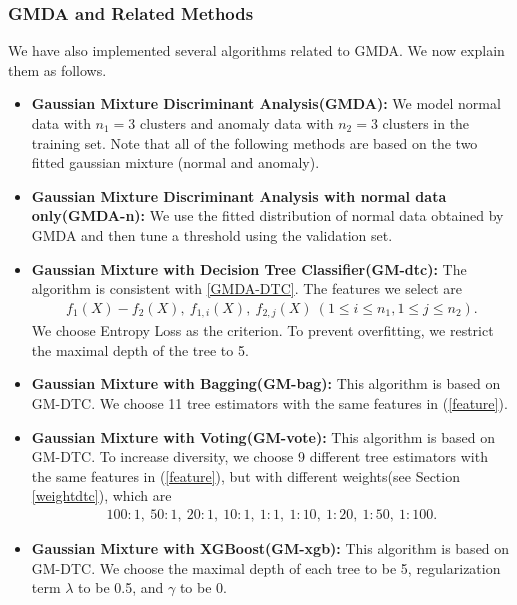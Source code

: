 \documentclass[english]{article}
\newenvironment{eqt}{\begin{equation}\begin{aligned}}{\end{aligned}\end{equation}}
\begin{document}
\subsubsection{GMDA and Related Methods}
\par We have also implemented several algorithms related to GMDA. We now explain them as follows.
\begin{itemize}
\item \textbf{Gaussian Mixture Discriminant Analysis(GMDA): } We model normal data with $n_1=3$ clusters and anomaly data with $n_2=3$ clusters in the training set. Note that all of the following methods are based on the two fitted gaussian mixture (normal and anomaly). 
\item \textbf{Gaussian Mixture Discriminant Analysis with normal data only(GMDA-n): } We use the fitted distribution of normal data obtained by GMDA and then tune a threshold using the validation set.
\item \textbf{Gaussian Mixture with Decision Tree Classifier(GM-dtc): } The algorithm is consistent with \ref{GMDA-DTC}. The features we select are
\begin{eqt}
\label{feature}
f_1(X) - f_2(X), \ f_{1, i}(X), \ f_{2, j}(X)\ (1\leqslant i\leqslant n_1, 1\leqslant j\leqslant n_2).
\end{eqt}
We choose Entropy Loss as the criterion. To prevent overfitting, we restrict the maximal depth of the tree to 5. 
\item \textbf{Gaussian Mixture with Bagging(GM-bag): } This algorithm is based on GM-DTC. We choose 11 tree estimators with the same features in (\ref{feature}). 
\item \textbf{Gaussian Mixture with Voting(GM-vote): } This algorithm is based on GM-DTC. To increase diversity, we choose 9 different tree estimators with the same features in (\ref{feature}), but with different weights(see Section \ref{weightdtc}), which are
\begin{eqt}
100:1,\ 50:1,\ 20:1,\ 10:1,\ 1:1,\ 1:10,\ 1:20,\ 1:50,\ 1:100.
\end{eqt}
\item \textbf{Gaussian Mixture with XGBoost(GM-xgb): } This algorithm is based on GM-DTC. We choose the maximal depth of each tree to be 5, regularization term $\lambda$ to be 0.5, and $\gamma$ to be 0.

\end{itemize}
\end{document}
